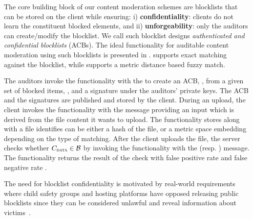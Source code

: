 The core building block of our content moderation schemes are blocklists that can be stored on the client while  ensuring: i) \textbf{confidentiality}: clients do not learn the constituent blocked elements, and ii) \textbf{unforgeability}: only the auditors can create/modify the blocklist. We call such blocklist designs  \emph{authenticated and confidential blocklists} (ACBs). The ideal functionality for auditable content moderation using such blocklists is presented in . \contentModFuncExact supports exact matching against the blocklist, while \contentModFuncFuzzy supports a metric distance based fuzzy match. 

The auditors invoke the functionality with the \createBlocklist to create an ACB, \blklistToken, from a given set of blocked items, \blocklist, and a signature under the auditors' private keys. The ACB and the signatures are published and stored by the client. During an upload, the client invokes the functionality with the \uploadFile message providing an input \clientMeta which is derived from the file content it wants to upload. The functionality stores \clientMeta along with a file identifies
\clientMeta can be either a hash of the file, or a metric space embedding depending on the type of matching. After the client uploads the file, the server checks whether $\clientMeta \in \blocklist$ by invoking the functionality with the \checkContent (resp. \checkContentFuzzy) message. The functionality returns the result of the check with false positive rate \fpr and false negative rate \fnr. 

\begin{remark}
The need for blocklist confidentiality is motivated by real-world requirements where child safety groups and hosting platforms have opposed releasing public blocklists since they can be considered unlawful and reveal information about victims~\cite{canetti2021broken,kulshrestha2021identifying}.
\end{remark}







